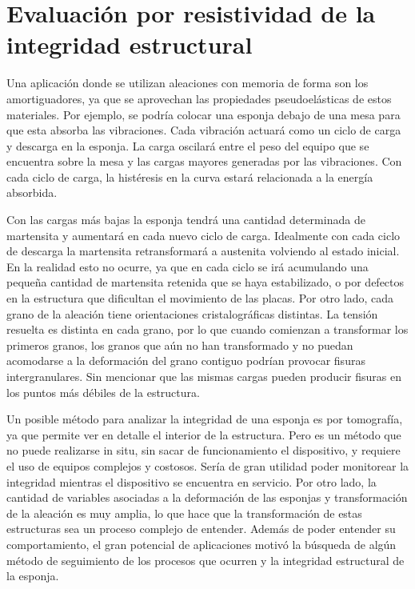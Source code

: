 \documentclass[a4paper,12pt,fleqn,twoside,openany]{book}
\begin{document}
\section{Evaluación por resistividad de la integridad estructural}


Una aplicación donde se utilizan aleaciones con memoria de forma son los amortiguadores, ya que se aprovechan las propiedades pseudoelásticas de estos materiales. Por ejemplo, se podría colocar una esponja debajo de una mesa para que esta absorba las vibraciones. Cada vibración actuará como un ciclo de carga y descarga en la esponja. 
La carga oscilará entre el peso del equipo que se encuentra sobre la mesa y las cargas mayores generadas por las vibraciones.
Con cada ciclo de carga, la histéresis en la curva estará relacionada a la energía absorbida.  

Con las cargas más bajas la esponja tendrá una cantidad determinada de martensita y aumentará en cada nuevo ciclo de carga. Idealmente con cada ciclo de descarga la martensita retransformará a austenita volviendo al estado inicial. En la realidad esto no ocurre, ya que en cada ciclo se irá acumulando una pequeña cantidad de martensita retenida que se haya estabilizado, o por defectos en la estructura que dificultan el movimiento de las placas. Por otro lado, cada grano de la aleación tiene orientaciones cristalográficas distintas. La tensión resuelta es distinta en cada grano, por lo que cuando comienzan a transformar los primeros granos, los granos que aún no han transformado y no puedan acomodarse a la deformación del grano contiguo podrían provocar fisuras intergranulares. Sin mencionar que las mismas cargas pueden producir fisuras en los puntos más débiles de la estructura. 

Un posible método para analizar la integridad de una esponja es por tomografía, ya que permite ver en detalle el interior de la estructura. Pero es un método  que no puede realizarse in situ, sin sacar de funcionamiento el dispositivo, y requiere el uso de equipos complejos y costosos. Sería de gran utilidad poder monitorear la integridad mientras el dispositivo se encuentra en servicio. Por otro lado, la cantidad de variables asociadas a la deformación de las esponjas y transformación de la aleación es muy amplia, lo que hace que la transformación de estas estructuras sea un proceso complejo de entender. Además de poder entender su comportamiento, el gran potencial de aplicaciones motivó la búsqueda de algún método de seguimiento de los procesos que ocurren y la integridad estructural de la esponja.
\end{document}
